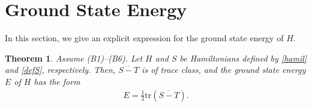 \documentclass[12pt,draft]{article}
\theoremstyle{plain}
\newtheorem{thm}[theorem]{\bf Theorem}
\numberwithin{equation}{section}
\theoremstyle{remark}
\begin{document}
\section{Ground State Energy}{\label{Sec:gse}}
In this section, we give an explicit expression for the ground state energy of $H$.

\begin{thm}\label{gse}
Assume (B1)--(B6). Let $H$ and $S$ be Hamiltonians defined by \eqref{hamil} and \eqref{defS}, respectively.
Then, $\overline{S-T}$ is of trace class, and the ground state energy $E$ of $H$ has the form
\begin{align}
  E = \frac{1}{2} \mathrm{tr}(\overline{S-T}). \label{eq:gse}
\end{align}
\end{thm}
\end{document}
